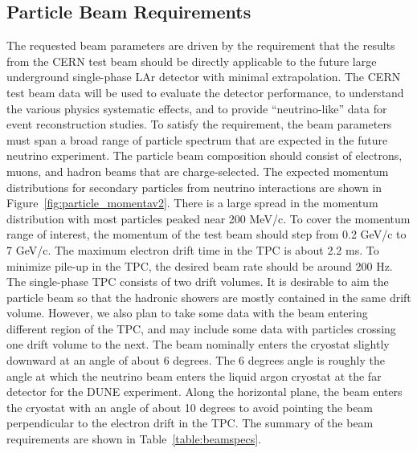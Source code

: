 
\subsection{Particle Beam Requirements}
The requested beam parameters are driven by the requirement that the results from the CERN test beam should be directly applicable to the future large underground single-phase LAr detector with minimal extrapolation. The CERN test beam data will be used to evaluate the detector performance, to understand the various physics systematic effects, and to provide ``neutrino-like'' data for event reconstruction studies. To satisfy the requirement, the beam parameters must span a broad range of particle spectrum that are expected in the future neutrino experiment. The particle beam composition should consist of electrons, muons, and hadron beams that are charge-selected. The expected momentum distributions for secondary particles from neutrino interactions are shown in Figure~\ref{fig:particle_momentav2}. There is a large spread in the momentum distribution with most particles peaked near 200 MeV/c. To cover the momentum range of interest, the momentum of the test beam should step from 0.2 GeV/c to 7 GeV/c. The maximum electron drift time in the TPC is about 2.2 ms. To minimize pile-up in the TPC, the desired beam rate should be around 200 Hz. The single-phase TPC consists of two drift volumes. It is desirable to aim the particle beam so that the hadronic showers are mostly contained in the same drift volume.  However, we also plan to take some data with the beam entering different region of the TPC, and may include some data with particles crossing one drift volume to the next. %
The beam nominally enters the cryostat slightly downward at an angle of about 6 degrees. The 6 degrees angle is roughly the angle at which the neutrino beam enters the liquid argon cryostat at the far detector for the DUNE experiment. Along the horizontal plane, the beam enters the cryostat with an angle of about 10 degrees to avoid pointing the beam perpendicular to the electron drift in the TPC. The summary of the beam requirements are shown in Table~\ref{table:beamspecs}.

